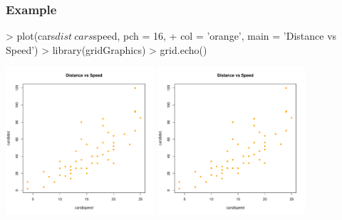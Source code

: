 \documentclass{beamer}
\begin{document}

\begin{frame}[fragile]
\frametitle{Example}
\begin{Schunk}
\begin{Sinput}
> plot(cars$dist ~ cars$speed, pch = 16, 
+      col = 'orange', main = 'Distance vs Speed')
> library(gridGraphics)
> grid.echo()
\end{Sinput}
\end{Schunk}

\begin{center}
  \includegraphics[height = 5.5cm, width = 5.5cm]{plot/intro_1.pdf}
  \includegraphics[height = 5.5cm, width = 5.5cm]{plot/intro_2.pdf}
\end{center}
\end{frame}

\end{document}
